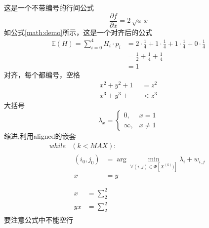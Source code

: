 这是一个不带编号的行间公式\\
$$ \frac{\partial f}{\partial x} = 2\,\sqrt{a}\,x $$
如公式\ref{math:demo}所示，这是一个对齐后的公式
\begin{equation}\label{math:demo}
\begin{aligned}
        \mathbb{E}\left ( H\right )=\sum _{i=0}^4H_i · p_i & =2 · \frac{1}{4}+1 · \frac{1}{4}+1 · \frac{1}{4}+0 · \frac{1}{4}\\
												           & =\frac{1}{2}+\frac{1}{4}+\frac{1}{4}\\
        												   & =1
\end{aligned}
\end{equation}
对齐，每个都编号，空格
\begin{align}
   x^2 + y^2 +1&=  z^2 \\
  x^3 + y^3 +\quad &<  z^3
\end{align}
大括号
\begin{equation}
\lambda_x = 
\left\{
 \begin{aligned}
 0,&x=1 \\ 
 \infty,&x\neq 1
\end{aligned}
 \right.
\end{equation}
缩进,利用aligned的嵌套
\begin{equation}
  \begin{aligned}
	while&(k<MAX):\\
		& \begin{aligned}
		  (i_0,j_0) &= \arg\min_{\forall(i,j)\in \Phi [X^{(k)})]} \lambda_i + w_{i,j}\\
		  x &= y\\
		\end{aligned} \\
		& \begin{aligned}
		  x&=\sum_2^2 \\
			yx&=\sum_2^2 
		\end{aligned}
  \end{aligned}
\end{equation}
要注意公式中不能空行
